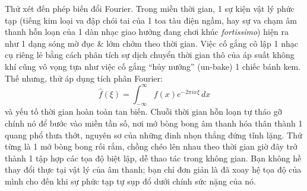 \documentclass[11pt]{article}
\begin{document}
Thử xét đến phép biến đổi Fourier. Trong miền thời gian, 1 sự kiện vật lý phức tạp (tiếng kim loại va đập chói tai của 1 toa tàu điện ngầm, hay sự va chạm âm thanh hỗn loạn của 1 dàn nhạc giao hưởng đang chơi khúc \textit{fortissimo}) hiện ra như 1 dạng sóng mờ đục \& lởm chởm theo thời gian. Việc cố gắng cô lập 1 nhạc cụ riêng lẻ bằng cách phân tích sự dịch chuyển thời gian thô của áp suất không khí cũng vô vọng tựa như việc cố gắng ``hủy nướng'' (un-bake) 1 chiếc bánh kem. Thế nhưng, thử áp dụng tích phân Fourier:
\[ \hat{f}(\xi) = \int_{-\infty}^{\infty} f(x) e^{-2\pi i x \xi} \, dx \]
và yếu tố thời gian hoàn toàn tan biến. Chuỗi thời gian hỗn loạn tự tháo gỡ chính nó để bước vào miền tần số, nơi mớ bòng bong âm thanh hóa thân thành 1 quang phổ thưa thớt, nguyên sơ của những đinh nhọn thẳng đứng tĩnh lặng. Thứ từng là 1 mớ bòng bong rối rắm, chồng chéo lên nhau theo thời gian giờ đây trở thành 1 tập hợp các tọa độ biệt lập, dễ thao tác trong không gian. Bạn không hề thay đổi thực tại vật lý của âm thanh; bạn chỉ đơn giản là đã xoay hệ tọa độ của mình cho đến khi sự phức tạp tự sụp đổ dưới chính sức nặng của nó.
\end{document}
